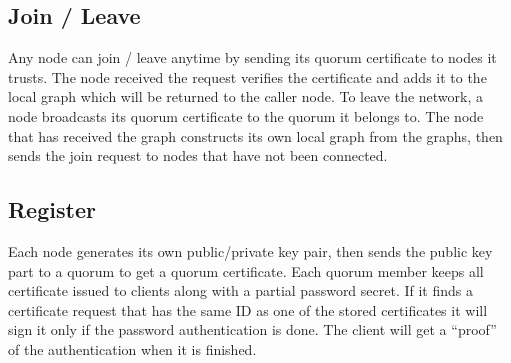 \subsection{Join / Leave}
Any node can join / leave anytime by sending its quorum certificate to
nodes it trusts. The node received the request verifies the
certificate and adds it to the local graph which will be returned to
the caller node. To leave the network, a node broadcasts its quorum
certificate to the quorum it belongs to.
The node that has received the graph constructs its own local graph
from the graphs, then sends the join request to nodes that have not
been connected.

\subsection{Register}
\label{register}
Each node generates its own public/private key pair, then sends the
public key part to a quorum to get a quorum certificate. Each quorum
member keeps all certificate issued to clients along with a partial
password secret. If it finds a certificate request that has the same
ID as one of the stored certificates it will sign it only if the
password authentication is done. The client will get a ``proof'' of
the authentication when it is finished.
